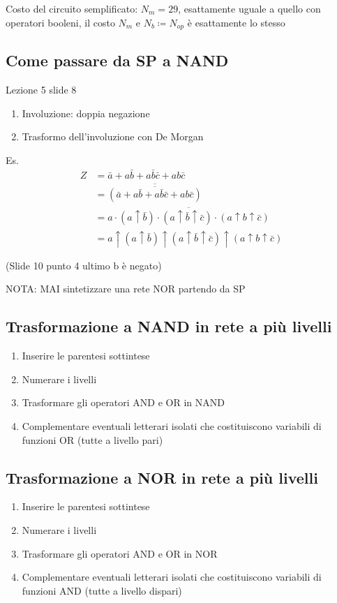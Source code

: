 \documentclass{article}
\begin{document}
Costo del circuito semplificato: $N_m = 29$, esattamente uguale a quello con operatori booleni, il costo $N_m$ e $N_b \coloneqq N_{op}$ è esattamente lo stesso

\subsection{Come passare da SP a NAND}
Lezione 5 slide 8

\begin{enumerate}
    \item Involuzione: doppia negazione
    \item Trasformo dell'involuzione con De Morgan
\end{enumerate}

Es.
\[
    \begin{split}
        Z &= \bar{a} + a \bar{b} + a\bar{b}\bar{c} + ab\bar{c} \\
        &= \overline{\overline{( \bar{a} + a \bar{b} + a\bar{b}\bar{c} + ab\bar{c} )}}\\
        &= \overline{a \cdot (a \uparrow \bar{b}) \cdot(a \uparrow \bar{b} \uparrow \bar{c}) \cdot (a \uparrow b \uparrow \bar{c})} \\
        &= a \uparrow (a \uparrow \bar{b}) \uparrow(a \uparrow \bar{b} \uparrow \bar{c}) \uparrow (a \uparrow b \uparrow \bar{c})
    \end{split}
\]

(Slide 10 punto 4 ultimo b è negato)

NOTA: MAI sintetizzare una rete NOR partendo da SP
\subsection{Trasformazione a NAND in rete a più livelli}
\begin{enumerate}
    \item Inserire le parentesi sottintese
    \item Numerare i livelli
    \item Trasformare gli operatori AND e OR in NAND
    \item Complementare eventuali letterari isolati che costituiscono variabili di funzioni OR (tutte a livello pari)
\end{enumerate}

\subsection{Trasformazione a NOR in rete a più livelli}
\begin{enumerate}
    \item Inserire le parentesi sottintese
    \item Numerare i livelli
    \item Trasformare gli operatori AND e OR in NOR
    \item Complementare eventuali letterari isolati che costituiscono variabili di funzioni AND (tutte a livello dispari)
\end{enumerate}
\end{document}
